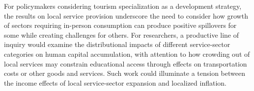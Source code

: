 \documentclass[12pt]{article}
\begin{document}
			 For policymakers considering tourism specialization as a development strategy, the results on local service provision underscore the need to consider how growth of sectors requiring in-person consumption can produce positive spillovers for some while creating challenges for others. For researchers, a productive line of inquiry would examine the distributional impacts of different service-sector categories on human capital accumulation, with attention to how crowding out of local services may constrain educational access through effects on transportation costs or other goods and services. Such work could illuminate a tension between the income effects of local service-sector expansion and localized inflation.
		
	
	
	
	
	
	
\end{document}
